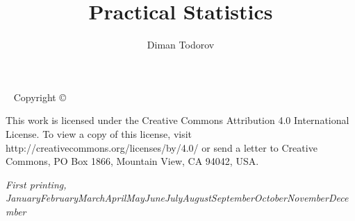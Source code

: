 \documentclass{tufte-book} %
\title{Practical Statistics} %
\author[Diman Todorov]{Diman Todorov} %
\newcommand{\monthyear}{\ifcase\month\or January\or February\or March\or April\or May\or June\or July\or August\or September\or October\or November\or December\fi\space\number\year} %
\newcommand{\openepigraph}[2]{ %
\begin{fullwidth}
\sffamily\large
\begin{doublespace}
\noindent\allcaps{#1}\\ %
\noindent\allcaps{#2} %
\end{doublespace}
\end{fullwidth}
}
\begin{document}
\frontmatter




\maketitle %


\newpage
\begin{fullwidth}
~\vfill
\thispagestyle{empty}
\setlength{\parindent}{0pt}
\setlength{\parskip}{\baselineskip}
Copyright \copyright\ \the\year\ \thanklessauthor

\par{}


\par This work is licensed under the Creative Commons Attribution 4.0 International License. To view a copy of this license, visit http://creativecommons.org/licenses/by/4.0/ or send a letter to Creative Commons, PO Box 1866, Mountain View, CA 94042, USA.

\par\textit{First printing, \monthyear}
\end{fullwidth}
\end{document}

